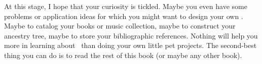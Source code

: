 At this stage, I hope that your curiosity is tickled.
Maybe you even have some problems or application ideas for which you might want to design your own \db.
Maybe to catalog your books or music collection, maybe to construct your ancestry tree, maybe to store your bibliographic references.
Nothing will help you more in learning about \dbs\ than doing your own little pet projects.
The second-best thing you can do is to read the rest of this book (or maybe any other book).%
%
\endhsection%
%
